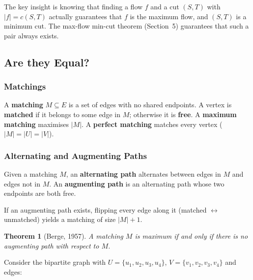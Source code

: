 \documentclass[11pt]{article}
\newtheorem{theorem}{Theorem}
\begin{document}
The key insight is knowing that finding a flow $f$ and a cut $(S,T)$
with $|f| = c(S,T)$ actually guarantees that $f$ is the maximum flow, and $(S,T)$ is a minimum cut.
The max-flow min-cut theorem
(Section~5) guarantees that such a pair always exists.

\subsection{Are they Equal?}
\subsubsection{Matchings}

A \textbf{matching} $M \subseteq E$ is a set of edges with no
shared endpoints.  A vertex is \textbf{matched} if it belongs to
some edge in $M$; otherwise it is \textbf{free}.  A
\textbf{maximum matching} maximises $|M|$.  A \textbf{perfect
matching} matches every vertex ($|M| = |U| = |V|$).

\subsubsection{Alternating and Augmenting Paths}

Given a matching $M$, an \textbf{alternating path} alternates
between edges in $M$ and edges not in $M$.  An
\textbf{augmenting path} is an alternating path whose two
endpoints are both free.

If an augmenting path exists, flipping every edge along it
(matched $\leftrightarrow$ unmatched) yields a matching of size
$|M| + 1$.

\begin{theorem}[Berge, 1957]
A matching $M$ is maximum if and only if there is no augmenting
path with respect to $M$.
\end{theorem}

Consider the bipartite graph with $U = \{u_1, u_2, u_3, u_4\}$,
$V = \{v_1, v_2, v_3, v_4\}$ and edges:

\begin{center}
\end{center}
\end{document}
